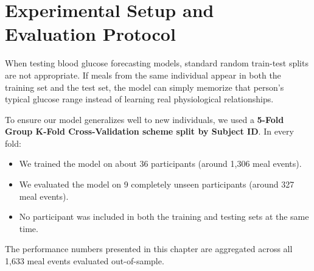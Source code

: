 \label{chap:results_benchmarks}

\section{Experimental Setup and Evaluation Protocol}
When testing blood glucose forecasting models, standard random train-test splits are not appropriate. If meals from the same individual appear in both the training set and the test set, the model can simply memorize that person's typical glucose range instead of learning real physiological relationships.

To ensure our model generalizes well to new individuals, we used a \textbf{5-Fold Group K-Fold Cross-Validation scheme split by Subject ID}. In every fold:
\begin{itemize}
    \item We trained the model on about 36 participants (around 1,306 meal events).
    \item We evaluated the model on 9 completely unseen participants (around 327 meal events).
    \item No participant was included in both the training and testing sets at the same time.
\end{itemize}
The performance numbers presented in this chapter are aggregated across all 1,633 meal events evaluated out-of-sample.


